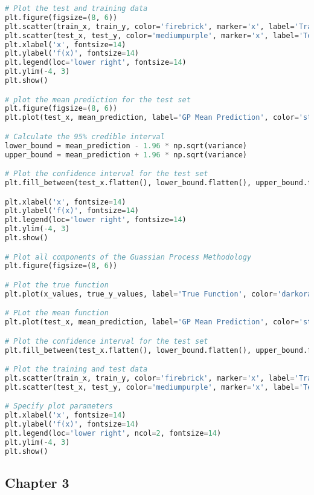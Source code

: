 \documentclass[12pt,a4paper]{article}
\begin{document}
\begin{lstlisting}[language=python, caption={Code of the Creation of Figure \ref{fig:GP meth}}]
# Plot the test and training data 
plt.figure(figsize=(8, 6))
plt.scatter(train_x, train_y, color='firebrick', marker='x', label='Training Data', s=50)
plt.scatter(test_x, test_y, color='mediumpurple', marker='x', label='Test Data', s=50)
plt.xlabel('x', fontsize=14)
plt.ylabel('f(x)', fontsize=14)
plt.legend(loc='lower right', fontsize=14)
plt.ylim(-4, 3) 
plt.show()

# plot the mean prediction for the test set
plt.figure(figsize=(8, 6))
plt.plot(test_x, mean_prediction, label='GP Mean Prediction', color='steelblue', linewidth=3)

# Calculate the 95% credible interval
lower_bound = mean_prediction - 1.96 * np.sqrt(variance)
upper_bound = mean_prediction + 1.96 * np.sqrt(variance)

# Plot the confidence interval for the test set
plt.fill_between(test_x.flatten(), lower_bound.flatten(), upper_bound.flatten(), color='powderblue', alpha=0.3, label='Credible Interval (95%)')

plt.xlabel('x', fontsize=14)
plt.ylabel('f(x)', fontsize=14)
plt.legend(loc='lower right', fontsize=14)
plt.ylim(-4, 3) 
plt.show()

# Plot all components of the Guassian Process Methodology 
plt.figure(figsize=(8, 6))

# Plot the true function
plt.plot(x_values, true_y_values, label='True Function', color='darkorange', linewidth=3)

# PLot the mean function
plt.plot(test_x, mean_prediction, label='GP Mean Prediction', color='steelblue', linewidth=3)

# Plot the confidence interval for the test set
plt.fill_between(test_x.flatten(), lower_bound.flatten(), upper_bound.flatten(), color='powderblue', alpha=0.3, label='Credible Interval (95%)')

# Plot the training and test data 
plt.scatter(train_x, train_y, color='firebrick', marker='x', label='Training Data', s=50)
plt.scatter(test_x, test_y, color='mediumpurple', marker='x', label='Test Data', s=50)

# Specify plot parameters
plt.xlabel('x', fontsize=14)
plt.ylabel('f(x)', fontsize=14)
plt.legend(loc='lower right', ncol=2, fontsize=14)
plt.ylim(-4, 3)
plt.show()
\end{lstlisting}

\subsection{ Chapter 3}
\label{Chapter 3}
\vspace{10pt}
\end{document}
